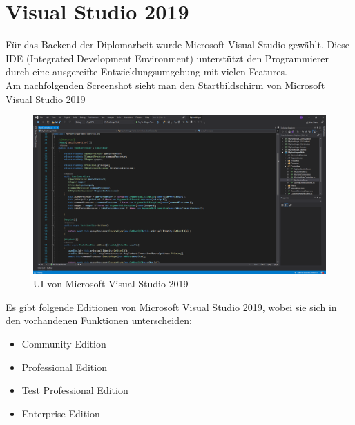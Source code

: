 \section{Visual Studio 2019}

Für das Backend der Diplomarbeit wurde Microsoft Visual Studio gewählt. Diese IDE (Integrated Development Environment) unterstützt den Programmierer durch eine ausgereifte Entwicklungsumgebung mit vielen Features.\\

Am nachfolgenden Screenshot sieht man den Startbildschirm von Microsoft Visual Studio 2019
\begin{figure}[h]
	\centerline{
		\includegraphics[width=1\textwidth, frame]{./grafiken/visual_studio_startview.png}
	}
	\vskip0pt
	\caption{UI von Microsoft Visual Studio 2019} \label{fig:visualStudioStartview}
\end{figure}

Es gibt folgende Editionen von Microsoft Visual Studio 2019, wobei sie sich in den vorhandenen Funktionen unterscheiden:
\begin{itemize}
	\item Community Edition
	\item Professional Edition
	\item Test Professional Edition
	\item Enterprise Edition
\end{itemize}

